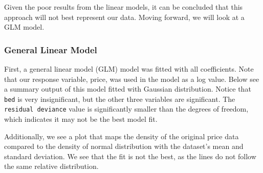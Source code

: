 \documentclass[11pt, a4paper]{article}
\begin{document}
Given the poor results from the linear models, it can be concluded that this approach will not best represent our data. Moving forward, we will look at a GLM model.

\subsubsection{General Linear Model}

First, a general linear model (GLM) model was fitted with all coefficients. Note that our response variable, price, was used in the model as a log value. Below see a summary output of this model fitted with Gaussian distribution. Notice that \texttt{bed} is very insignificant, but the other three variables are significant. The \texttt{residual deviance} value is significantly smaller than the degrees of freedom, which indicates it may not be the best model fit. 

Additionally, we see a plot that maps the density of the original price data compared to the density of normal distribution with the dataset's mean and standard deviation. We see that the fit is not the best, as the lines do not follow the same relative distribution.
\end{document}
